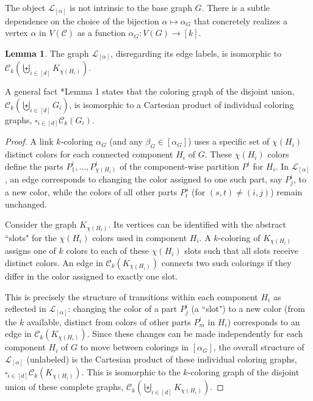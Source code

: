\documentclass{amsart}
\theoremstyle{hypothesisstyle}
\theoremstyle{definition}
\newtheorem{lemma}[theorem]{Lemma}
\theoremstyle{remark}
\numberwithin{equation}{section}
\begin{document}
The object $\mathcal{L}_{[\alpha]}$ is not intrinsic to the base graph $G$. There is a subtle dependence on the choice of the bijection $\alpha \mapsto \alpha_{G}$ that concretely realizes a vertex $\alpha$ in $V(\mathcal{C})$ as a function $\alpha_G\colon V(G)\to [k]$. 

\begin{lemma}
   The graph $\mathcal{L}_{[\alpha]}$, disregarding its edge labels, is isomorphic to $\mathcal{C}_k\left(\biguplus_{i\in [d]} K_{\chi(H_i)}\right)$.
\end{lemma}

A general fact \cite{BFHRS16}*{Lemma 1} states that the coloring graph of the disjoint union, $\mathcal{C}_k\left(\biguplus_{i\in [d]} G_i\right)$, is isomorphic to a Cartesian product of individual coloring graphs, $\square_{i\in[d]}\mathcal{C}_{k}(G_i)$. 

\begin{proof}
A link $k$-coloring $\alpha_G$ (and any $\beta_G \in [\alpha_G]$) uses a specific set of $\chi(H_i)$ distinct colors for each connected component $H_i$ of $G$. These $\chi(H_i)$ colors define the parts $P^i_1, \dots, P^i_{\chi(H_i)}$ of the component-wise partition $P^i$ for $H_i$. In $\mathcal{L}_{[\alpha]}$, an edge corresponds to changing the color assigned to one such part, say $P^i_j$, to a new color, while the colors of all other parts $P^s_t$ (for $(s,t) \neq (i,j)$) remain unchanged.

Consider the graph $K_{\chi(H_i)}$. Its vertices can be identified with the abstract ``slots" for the $\chi(H_i)$ colors used in component $H_i$. A $k$-coloring of $K_{\chi(H_i)}$ assigns one of $k$ colors to each of these $\chi(H_i)$ slots such that all slots receive distinct colors. An edge in $\mathcal{C}_k(K_{\chi(H_i)})$ connects two such colorings if they differ in the color assigned to exactly one slot.

This is precisely the structure of transitions within each component $H_i$ as reflected in $\mathcal{L}_{[\alpha]}$: changing the color of a part $P^i_j$ (a ``slot") to a new color (from the $k$ available, distinct from colors of other parts $P^i_m$ in $H_i$) corresponds to an edge in $\mathcal{C}_k(K_{\chi(H_i)})$. Since these changes can be made independently for each component $H_i$ of $G$ to move between colorings in $[\alpha_G]$, the overall structure of $\mathcal{L}_{[\alpha]}$ (unlabeled) is the Cartesian product of these individual coloring graphs, $\square_{i\in[d]}\mathcal{C}_{k}(K_{\chi(H_i)})$. This is isomorphic to the $k$-coloring graph of the disjoint union of these complete graphs, $\mathcal{C}_k\left(\biguplus_{i\in [d]} K_{\chi(H_i)}\right)$.
\end{proof}
\end{document}
